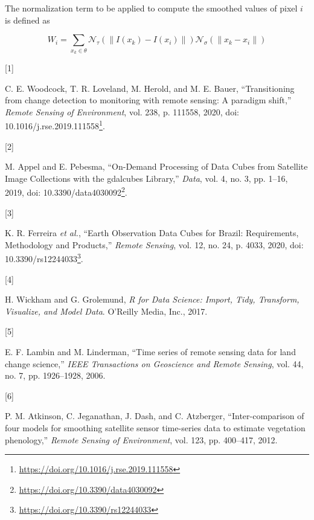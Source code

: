 \documentclass[
  11pt,
]{report}
\newlength{\cslhangindent}
\newlength{\csllabelwidth}
\newlength{\cslentryspacingunit} %
\newenvironment{CSLReferences}[2] %
 {%
  \setlength{\parindent}{0pt}
  \ifodd #1
  \let\oldpar\par
  \def\par{\hangindent=\cslhangindent\oldpar}
  \fi
  \setlength{\parskip}{#2\cslentryspacingunit}
 }%
 {}
\newcommand{\CSLLeftMargin}[1]{\parbox[t]{\csllabelwidth}{#1}}
\newcommand{\CSLRightInline}[1]{\parbox[t]{\linewidth - \csllabelwidth}{#1}\break}
\renewcommand{\href}[2]{#2\footnote{\url{#1}}}
\begin{document}
The normalization term to be applied to compute the smoothed values of
pixel \(i\) is defined as

\[
W_{i} = \sum_{x_k \in \theta}{\mathcal{N}_{\tau}(\|I(x_k) - I(x_i)\|)\mathcal{N}_{\sigma}(\|x_k - x_i\|)}
\]

\hypertarget{refs}{}
\begin{CSLReferences}{0}{0}
\leavevmode{}%
\CSLLeftMargin{{[}1{]} }%
\CSLRightInline{C. E. Woodcock, T. R. Loveland, M. Herold, and M. E.
Bauer, {``Transitioning from change detection to monitoring with remote
sensing: {A} paradigm shift,''} \emph{Remote Sensing of Environment},
vol. 238, p. 111558, 2020, doi:
\href{https://doi.org/10.1016/j.rse.2019.111558}{10.1016/j.rse.2019.111558}.}

\leavevmode{}%
\CSLLeftMargin{{[}2{]} }%
\CSLRightInline{M. Appel and E. Pebesma, {``On-{Demand Processing} of
{Data Cubes} from {Satellite Image Collections} with the gdalcubes
{Library},''} \emph{Data}, vol. 4, no. 3, pp. 1--16, 2019, doi:
\href{https://doi.org/10.3390/data4030092}{10.3390/data4030092}.}

\leavevmode{}%
\CSLLeftMargin{{[}3{]} }%
\CSLRightInline{K. R. Ferreira \emph{et al.}, {``Earth {Observation Data
Cubes} for {Brazil}: {Requirements}, {Methodology} and {Products},''}
\emph{Remote Sensing}, vol. 12, no. 24, p. 4033, 2020, doi:
\href{https://doi.org/10.3390/rs12244033}{10.3390/rs12244033}.}

\leavevmode{}%
\CSLLeftMargin{{[}4{]} }%
\CSLRightInline{H. Wickham and G. Grolemund, \emph{R for {Data Science}:
{Import}, {Tidy}, {Transform}, {Visualize}, and {Model Data}}. {O'Reilly
Media, Inc.}, 2017.}

\leavevmode{}%
\CSLLeftMargin{{[}5{]} }%
\CSLRightInline{E. F. Lambin and M. Linderman, {``Time series of remote
sensing data for land change science,''} \emph{IEEE Transactions on
Geoscience and Remote Sensing}, vol. 44, no. 7, pp. 1926--1928, 2006.}

\leavevmode{}%
\CSLLeftMargin{{[}6{]} }%
\CSLRightInline{P. M. Atkinson, C. Jeganathan, J. Dash, and C.
Atzberger, {``Inter-comparison of four models for smoothing satellite
sensor time-series data to estimate vegetation phenology,''}
\emph{Remote Sensing of Environment}, vol. 123, pp. 400--417, 2012.}


\end{CSLReferences}
\end{document}
